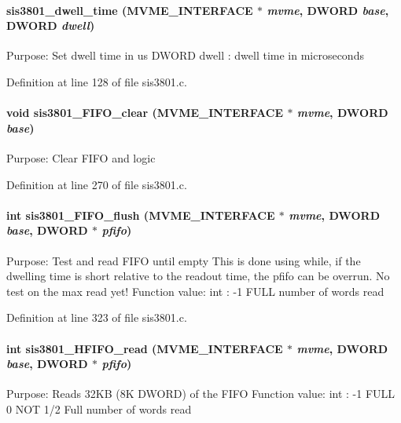 \paragraph[{sis3801\_\-dwell\_\-time}]{ sis3801\_\-dwell\_\-time ({\bf MVME\_\-INTERFACE} $\ast$ {\em mvme}, \/  {\bf DWORD} {\em base}, \/  {\bf DWORD} {\em dwell})}\hfill\label{sis3801_8h_a30131d1123d09c8a0244ce086a72efd2}
Purpose: Set dwell time in us DWORD dwell : dwell time in microseconds 

Definition at line 128 of file sis3801.c.
\paragraph[{sis3801\_\-FIFO\_\-clear}]{\setlength{\rightskip}{0pt plus 5cm}void sis3801\_\-FIFO\_\-clear ({\bf MVME\_\-INTERFACE} $\ast$ {\em mvme}, \/  {\bf DWORD} {\em base})}\hfill\label{sis3801_8h_aa4adc6e9d7174d4f14a0fe24eeff603f}
Purpose: Clear FIFO and logic 

Definition at line 270 of file sis3801.c.
\paragraph[{sis3801\_\-FIFO\_\-flush}]{\setlength{\rightskip}{0pt plus 5cm}int sis3801\_\-FIFO\_\-flush ({\bf MVME\_\-INTERFACE} $\ast$ {\em mvme}, \/  {\bf DWORD} {\em base}, \/  {\bf DWORD} $\ast$ {\em pfifo})}\hfill\label{sis3801_8h_a582b23c0d4b194f737cf9bf62e44de9e}
Purpose: Test and read FIFO until empty This is done using while, if the dwelling time is short relative to the readout time, the pfifo can be overrun. No test on the max read yet! Function value: int : -\/1 FULL number of words read 

Definition at line 323 of file sis3801.c.
\paragraph[{sis3801\_\-HFIFO\_\-read}]{\setlength{\rightskip}{0pt plus 5cm}int sis3801\_\-HFIFO\_\-read ({\bf MVME\_\-INTERFACE} $\ast$ {\em mvme}, \/  {\bf DWORD} {\em base}, \/  {\bf DWORD} $\ast$ {\em pfifo})}\hfill\label{sis3801_8h_a01ae0f7294447474a14a4f9327ac42f1}
Purpose: Reads 32KB (8K DWORD) of the FIFO Function value: int : -\/1 FULL 0 NOT 1/2 Full number of words read 


